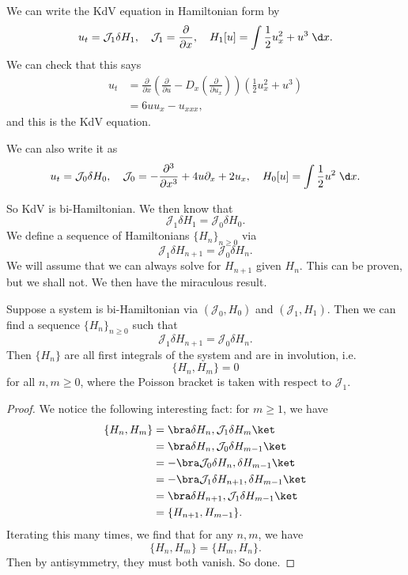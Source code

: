 \documentclass[a4paper]{article}
\begin{document}
\begin{eg}
  We can write the KdV equation in Hamiltonian form by
  \[
    u_t = \mathcal{J}_1 \delta H_1,\quad \mathcal{J}_1 = \frac{\partial}{\partial x},\quad H_1[u] =\int \frac{1}{2}u_x^2 + u^3 \;\d x.
  \]
  We can check that this says
  \begin{align*}
    u_t &= \frac{\partial}{\partial x}\left(\frac{\partial}{\partial u} - D_x \left(\frac{\partial}{\partial u_x}\right)\right)\left(\frac{1}{2}u_x^2 + u^3\right)\\
    &= 6uu_x- u_{xxx},
  \end{align*}
  and this is the KdV equation.

  We can also write it as
  \[
    u_t = \mathcal{J}_0 \delta H_0,\quad \mathcal{J}_0 = - \frac{\partial^3}{\partial x^3} + 4u \partial_x + 2 u_x,\quad H_0[u] = \int \frac{1}{2}u^2 \;\d x.
  \]
\end{eg}
So KdV is bi-Hamiltonian. We then know that
\[
  \mathcal{J}_1 \delta H_1 = \mathcal{J}_0 \delta H_0.
\]
We define a sequence of Hamiltonians $\{H_n\}_{n \geq 0}$ via
\[
  \mathcal{J}_1 \delta H_{n + 1} = \mathcal{J}_0 \delta H_n.
\]
We will assume that we can always solve for $H_{n + 1}$ given $H_n$. This can be proven, but we shall not. We then have the miraculous result.

\begin{thm}
  Suppose a system is bi-Hamiltonian via $(\mathcal{J}_0, H_0)$ and $(\mathcal{J}_1, H_1)$. Then we can find a sequence $\{H_n\}_{n \geq 0}$ such that
  \[
    \mathcal{J}_1 \delta H_{n + 1} = \mathcal{J}_0 \delta H_n.
  \]
  Then $\{H_n\}$ are all first integrals of the system and are in involution, i.e.
  \[
    \{H_n, H_m\} = 0
  \]
  for all $n, m \geq 0$, where the Poisson bracket is taken with respect to $\mathcal{J}_1$.
\end{thm}

\begin{proof}
  We notice the following interesting fact: for $m \geq 1$, we have
  \begin{align*}
    \{H_n, H_m\} &= \bra \delta H_n, \mathcal{J}_1 \delta H_m\ket\\
    &= \bra \delta H_n, \mathcal{J}_0 \delta H_{m - 1}\ket\\
    &= - \bra \mathcal{J}_0 \delta H_n, \delta H_{m - 1}\ket\\
    &= - \bra \mathcal{J}_1 \delta H_{n + 1}, \delta H_{m - 1}\ket\\
    &= \bra \delta H_{n + 1}, \mathcal{J}_1 \delta H_{m - 1}\ket\\
    &= \{H_{n + 1}, H_{m - 1}\}.
  \end{align*}
  Iterating this many times, we find that for any $n, m$, we have
  \[
    \{H_n, H_m\} = \{H_m, H_n\}.
  \]
  Then by antisymmetry, they must both vanish. So done.
\end{proof}
\end{document}
